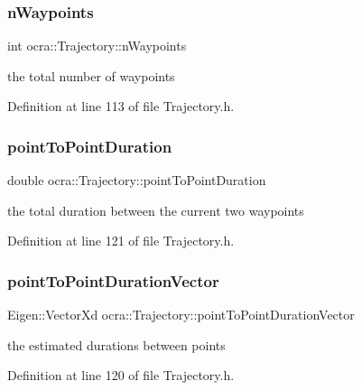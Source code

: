 \subsubsection{\texorpdfstring{n\+Waypoints}{nWaypoints}}
{\footnotesize\ttfamily int ocra\+::\+Trajectory\+::n\+Waypoints\hspace{0.3cm}{\ttfamily [protected]}}

the total number of waypoints 

Definition at line 113 of file Trajectory.\+h.

\hypertarget{classocra_1_1Trajectory_a7601711560c35d3096ed541708cce691}{}\label{classocra_1_1Trajectory_a7601711560c35d3096ed541708cce691} 
\subsubsection{\texorpdfstring{point\+To\+Point\+Duration}{pointToPointDuration}}
{\footnotesize\ttfamily double ocra\+::\+Trajectory\+::point\+To\+Point\+Duration\hspace{0.3cm}{\ttfamily [protected]}}

the total duration between the current two waypoints 

Definition at line 121 of file Trajectory.\+h.

\hypertarget{classocra_1_1Trajectory_ad00d173bd78dc9ff365736e751fa3ef8}{}\label{classocra_1_1Trajectory_ad00d173bd78dc9ff365736e751fa3ef8} 
\subsubsection{\texorpdfstring{point\+To\+Point\+Duration\+Vector}{pointToPointDurationVector}}
{\footnotesize\ttfamily Eigen\+::\+Vector\+Xd ocra\+::\+Trajectory\+::point\+To\+Point\+Duration\+Vector\hspace{0.3cm}{\ttfamily [protected]}}

the estimated durations between points 

Definition at line 120 of file Trajectory.\+h.

\hypertarget{classocra_1_1Trajectory_af07103499262cbe56eba69a713e4f3b3}{}\label{classocra_1_1Trajectory_af07103499262cbe56eba69a713e4f3b3} 
